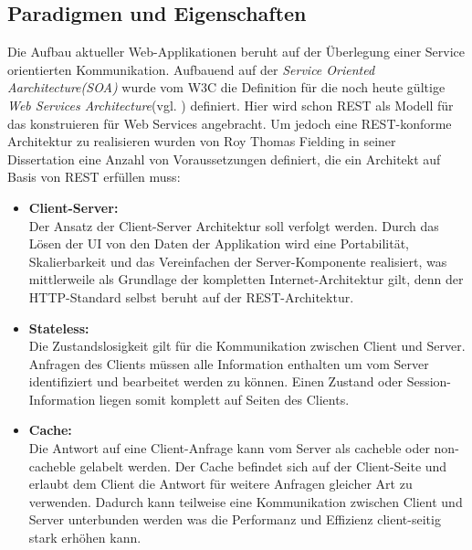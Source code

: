 \documentclass[fleqn,10pt,ngerman]{SelfArx}
\begin{document}
\subsection{Paradigmen und Eigenschaften}
Die Aufbau aktueller Web-Applikationen beruht auf der Überlegung einer Service orientierten Kommunikation. Aufbauend auf der \textit{Service Oriented Aarchitecture(SOA)} wurde vom W3C die Definition für die noch heute gültige \textit{Web Services Architecture}(vgl. \cite{WSA}) definiert. Hier wird schon REST als Modell für das konstruieren für Web Services angebracht. Um jedoch eine REST-konforme Architektur zu realisieren wurden von Roy Thomas Fielding in seiner Dissertation\cite{Fielding:2000} eine Anzahl von Voraussetzungen definiert, die ein Architekt auf Basis von REST erfüllen muss:

\begin{itemize}
	\item \textbf{Client-Server:}\\ Der Ansatz der Client-Server Architektur soll verfolgt werden. Durch das Lösen der UI von den Daten der Applikation wird eine Portabilität, Skalierbarkeit und das Vereinfachen der Server-Komponente realisiert, was mittlerweile als Grundlage der kompletten Internet-Architektur gilt, denn der HTTP-Standard selbst beruht auf der REST-Architektur.
	\item \textbf{Stateless:}\\ Die Zustandslosigkeit gilt für die Kommunikation zwischen Client und Server. Anfragen des Clients müssen alle Information enthalten um vom Server identifiziert und bearbeitet werden zu können. Einen Zustand oder Session-Information liegen somit komplett auf Seiten des Clients.
	\item \textbf{Cache:}\\ Die Antwort auf eine Client-Anfrage kann vom Server als cacheble oder non-cacheble gelabelt werden. Der Cache befindet sich auf der Client-Seite und erlaubt dem Client die Antwort für weitere Anfragen gleicher Art zu verwenden. Dadurch kann teilweise eine Kommunikation zwischen Client und Server unterbunden werden was die Performanz und Effizienz client-seitig stark erhöhen kann.

\end{itemize}
\end{document}
